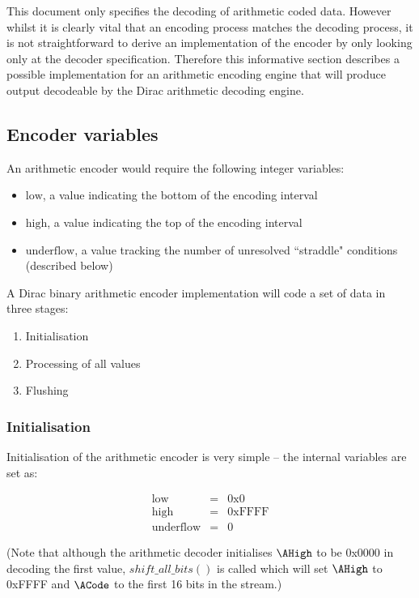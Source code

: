 This document only specifies the decoding of arithmetic coded data. 
However whilst it is clearly vital that an encoding process matches the decoding
process, it is not straightforward to derive an implementation of the
encoder by only looking only at the decoder specification. Therefore this
informative section describes a possible implementation for an
arithmetic encoding engine that will produce output decodeable by
the Dirac arithmetic decoding engine.

\subsection{Encoder variables}

An arithmetic encoder would require the following integer variables:

\begin{itemize}
\item $\text{low}$, a value indicating the bottom of the encoding interval
\item $\text{high}$, a value indicating the top of the encoding interval
\item $\text{underflow}$, a value tracking the number of unresolved ``straddle" conditions 
(described below)
\end{itemize}

A Dirac binary arithmetic encoder implementation will code a set of data in three stages:

\begin{enumerate}
\item Initialisation
\item Processing of all values
\item Flushing
\end{enumerate}

\subsubsection{Initialisation}

Initialisation of the arithmetic encoder is very simple -- the internal variables are
set as:

\begin{eqnarray*}
\text{low}&=&\text{0x0} \\
\text{high}&=&\text{0xFFFF} \\
\text{underflow}&=&0
\end{eqnarray*}

(Note that although the arithmetic decoder initialises $\AHigh$ to be 0x0000 in decoding the first
value, $shift\_all\_bits()$ is called which will set $\AHigh$ to 0xFFFF and $\ACode$ to the first
16 bits in the stream.)

